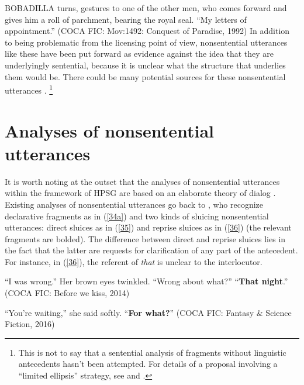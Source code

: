 \ea BOBADILLA turns, gestures to one of the other men, who comes forward and gives him a roll of parchment, bearing the royal seal. ``My letters of appointment.'' (COCA  FIC: Mov:1492: Conquest of Paradise, 1992)\label{34}\z
%
In addition to being problematic from the licensing point of view, nonsentential utterances like these have been put forward as evidence against the idea that they are underlyingly sentential, because it is unclear what the structure that underlies them would be. There could be many potential sources for
these nonsentential utterances 
\citep[see][306]{CJ2005a}.%
\footnote{This is not to say that a sentential analysis of fragments without linguistic antecedents hasn't been attempted. For details of a proposal involving a ``limited ellipsis'' strategy, see \citet{Merchant2005a} and \citet{Merchant2010}.}


\section{Analyses of nonsentential utterances}
\label{sec-analyses-of-NSUs}

It is worth noting at the outset that the analyses of nonsentential utterances within the framework of HPSG are based on an elaborate theory of dialog %
\citep{Ginzburg1994, Ginzburg2004, Ginzburg2014a, Larsson2002, Purver2006, Fernandez2006, Fernandez2002, Fernandez2007, Ginzburg2010, Ginzburg2014b, Ginzburg2012, Ginzburg2013, Kim2019}. Existing analyses of nonsentential utterances go back to \citet{Ginzburg:Sag:2000}, who recognize declarative fragments as in (\ref{34a}) and two kinds of sluicing nonsentential utterances: direct sluices as in (\ref{35}) and reprise sluices as  in (\ref{36}) (the relevant fragments are bolded). The difference between direct and reprise sluices lies in the fact that the latter are requests for clarification of any part of the antecedent. For instance, in (\ref{36}), the referent of \textit{that} is unclear to the interlocutor.

\ea ``I was wrong.'' Her brown eyes twinkled. ``Wrong about what?'' ``\textbf{That night}.'' (COCA FIC: Before we kiss, 2014) \label{34a}\z

\ea ``You're waiting,'' she said softly. ``\textbf{For what?}'' (COCA FIC: Fantasy \& Science Fiction, 2016) \label{35} \z

